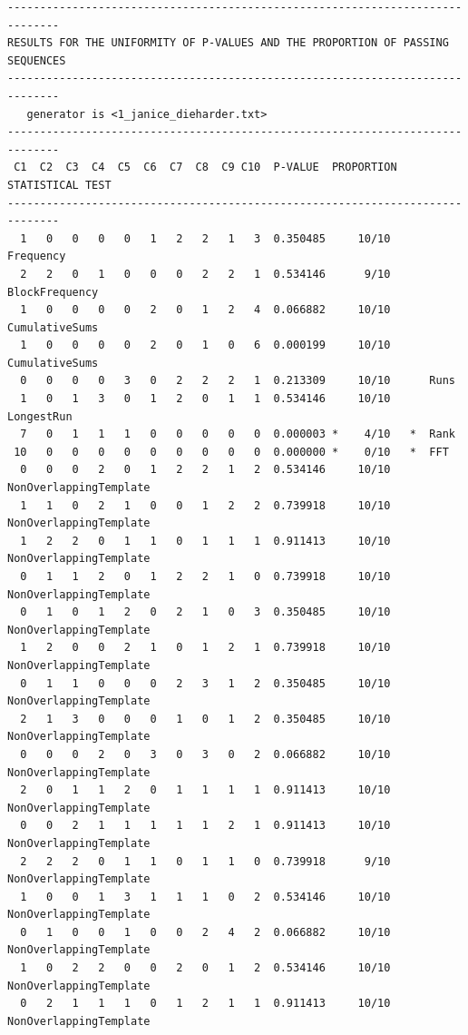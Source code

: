 \documentclass[12pt, titlepage]{report}
\theoremstyle{definition}
\begin{document}
{\begin{verbatim}
------------------------------------------------------------------------------
RESULTS FOR THE UNIFORMITY OF P-VALUES AND THE PROPORTION OF PASSING SEQUENCES
------------------------------------------------------------------------------
   generator is <1_janice_dieharder.txt>
------------------------------------------------------------------------------
 C1  C2  C3  C4  C5  C6  C7  C8  C9 C10  P-VALUE  PROPORTION  STATISTICAL TEST
------------------------------------------------------------------------------
  1   0   0   0   0   1   2   2   1   3  0.350485     10/10      Frequency
  2   2   0   1   0   0   0   2   2   1  0.534146      9/10      BlockFrequency
  1   0   0   0   0   2   0   1   2   4  0.066882     10/10      CumulativeSums
  1   0   0   0   0   2   0   1   0   6  0.000199     10/10      CumulativeSums
  0   0   0   0   3   0   2   2   2   1  0.213309     10/10      Runs
  1   0   1   3   0   1   2   0   1   1  0.534146     10/10      LongestRun
  7   0   1   1   1   0   0   0   0   0  0.000003 *    4/10   *  Rank
 10   0   0   0   0   0   0   0   0   0  0.000000 *    0/10   *  FFT
  0   0   0   2   0   1   2   2   1   2  0.534146     10/10      NonOverlappingTemplate
  1   1   0   2   1   0   0   1   2   2  0.739918     10/10      NonOverlappingTemplate
  1   2   2   0   1   1   0   1   1   1  0.911413     10/10      NonOverlappingTemplate
  0   1   1   2   0   1   2   2   1   0  0.739918     10/10      NonOverlappingTemplate
  0   1   0   1   2   0   2   1   0   3  0.350485     10/10      NonOverlappingTemplate
  1   2   0   0   2   1   0   1   2   1  0.739918     10/10      NonOverlappingTemplate
  0   1   1   0   0   0   2   3   1   2  0.350485     10/10      NonOverlappingTemplate
  2   1   3   0   0   0   1   0   1   2  0.350485     10/10      NonOverlappingTemplate
  0   0   0   2   0   3   0   3   0   2  0.066882     10/10      NonOverlappingTemplate
  2   0   1   1   2   0   1   1   1   1  0.911413     10/10      NonOverlappingTemplate
  0   0   2   1   1   1   1   1   2   1  0.911413     10/10      NonOverlappingTemplate
  2   2   2   0   1   1   0   1   1   0  0.739918      9/10      NonOverlappingTemplate
  1   0   0   1   3   1   1   1   0   2  0.534146     10/10      NonOverlappingTemplate
  0   1   0   0   1   0   0   2   4   2  0.066882     10/10      NonOverlappingTemplate
  1   0   2   2   0   0   2   0   1   2  0.534146     10/10      NonOverlappingTemplate
  0   2   1   1   1   0   1   2   1   1  0.911413     10/10      NonOverlappingTemplate

\end{verbatim}}
\end{document}
